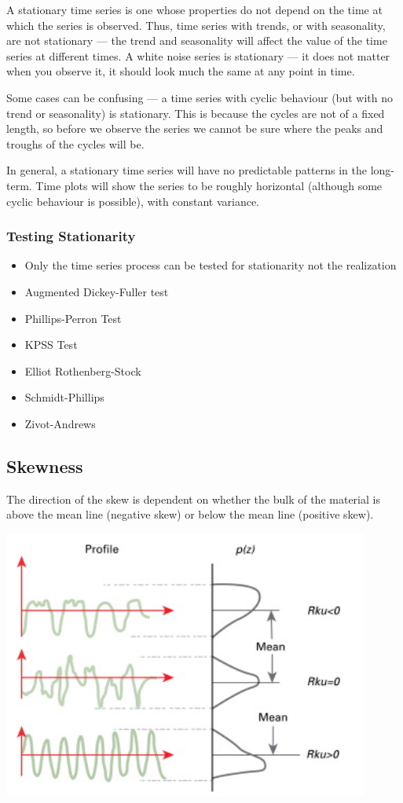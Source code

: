 \documentclass[
]{article}
\begin{document}
A stationary time series is one whose properties do not depend on the
time at which the series is observed. Thus, time series with trends, or
with seasonality, are not stationary --- the trend and seasonality will
affect the value of the time series at different times. A white noise
series is stationary --- it does not matter when you observe it, it
should look much the same at any point in time.

Some cases can be confusing --- a time series with cyclic behaviour (but
with no trend or seasonality) is stationary. This is because the cycles
are not of a fixed length, so before we observe the series we cannot be
sure where the peaks and troughs of the cycles will be.

In general, a stationary time series will have no predictable patterns
in the long-term. Time plots will show the series to be roughly
horizontal (although some cyclic behaviour is possible), with constant
variance.

\hypertarget{testing-stationarity}{%
\subsubsection{Testing Stationarity}\label{testing-stationarity}}

\begin{itemize}
\item
  Only the time series process can be tested for stationarity not the
  realization
\item
  Augmented Dickey-Fuller test
\item
  Phillips-Perron Test
\item
  KPSS Test
\item
  Elliot Rothenberg-Stock
\item
  Schmidt-Phillips
\item
  Zivot-Andrews
\end{itemize}

\hypertarget{skewness}{%
\subsection{Skewness}\label{skewness}}

The direction of the skew is dependent on whether the bulk of the
material is above the mean line (negative skew) or below the mean line
(positive skew).

\includegraphics[width=0.5\linewidth]{skewness}
\end{document}
